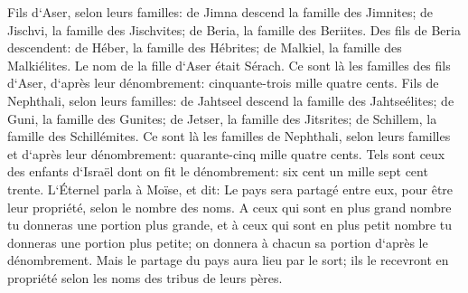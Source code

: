 \verse Fils d`Aser, selon leurs familles: de Jimna descend la famille des Jimnites; de Jischvi, la famille des Jischvites; de Beria, la famille des Beriites. 
\verse Des fils de Beria descendent: de Héber, la famille des Hébrites; de Malkiel, la famille des Malkiélites. 
\verse Le nom de la fille d`Aser était Sérach. 
\verse Ce sont là les familles des fils d`Aser, d`après leur dénombrement: cinquante-trois mille quatre cents. 
\verse Fils de Nephthali, selon leurs familles: de Jahtseel descend la famille des Jahtseélites; de Guni, la famille des Gunites; 
\verse de Jetser, la famille des Jitsrites; de Schillem, la famille des Schillémites. 
\verse Ce sont là les familles de Nephthali, selon leurs familles et d`après leur dénombrement: quarante-cinq mille quatre cents. 
\verse Tels sont ceux des enfants d`Israël dont on fit le dénombrement: six cent un mille sept cent trente. 
\verse L`Éternel parla à Moïse, et dit: 
\verse Le pays sera partagé entre eux, pour être leur propriété, selon le nombre des noms. 
\verse A ceux qui sont en plus grand nombre tu donneras une portion plus grande, et à ceux qui sont en plus petit nombre tu donneras une portion plus petite; on donnera à chacun sa portion d`après le dénombrement. 
\verse Mais le partage du pays aura lieu par le sort; ils le recevront en propriété selon les noms des tribus de leurs pères. 
